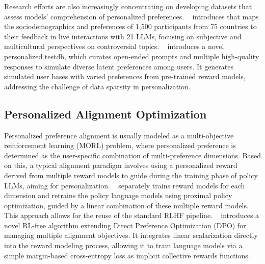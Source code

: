 Research efforts are also increasingly concentrating on developing datasets that assess models' comprehension of personalized preferences. ~\cite{kirk2024prism} introduces  that maps the sociodemographics and preferences of 1,500 participants from 75 countries to their feedback in live interactions with 21 LLMs, focusing on subjective and multicultural perspectives on controversial topics. ~\citep{zollo2024personalllm} introduces a novel personalized testdb, which curates open-ended prompts and multiple high-quality responses to simulate diverse latent preferences among users. It generates simulated user bases with varied preferences from pre-trained reward models, addressing the challenge of data sparsity in personalization.

\subsection{Personalized Alignment Optimization}
\label{subsec:optimization}

Personalized preference alignment is usually modeled as a multi-objective reinforcement learning (MORL) problem, where personalized preference is determined as the user-specific combination of multi-preference dimensions. Based on this, a typical alignment paradigm involves using a personalized reward derived from multiple reward models to guide during the training phase of policy LLMs, aiming for personalization. ~\citep{wu2023fine} separately trains reward models for each dimension and retrains the policy language models using proximal policy optimization, guided by a linear combination of these multiple reward models. This approach allows for the reuse of the standard RLHF pipeline. ~\citep{zhou2023beyond} introduces a novel RL-free algorithm extending Direct Preference Optimization (DPO) for managing multiple alignment objectives. It integrates linear scalarization directly into the reward modeling process, allowing it to train language models via a simple margin-based cross-entropy loss as implicit collective rewards functions.

